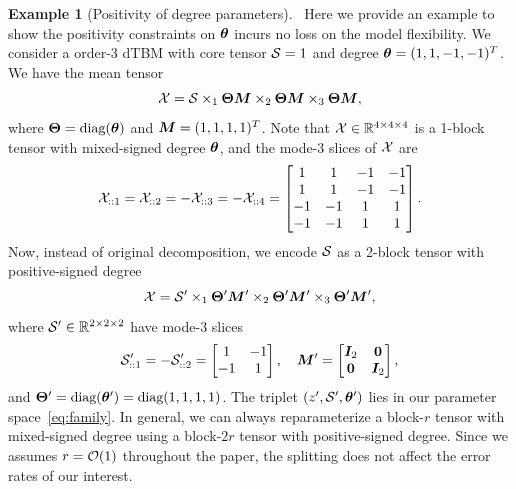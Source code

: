\documentclass[lettersize,onecolumn,journal]{IEEEtran}
\theoremstyle{definition}
\theoremstyle{definition}
\newtheorem{example}{Example}
\begin{document}
\begin{example}[Positivity of degree parameters]~\label{ex:positive}
Here we provide an example to show the positivity constraints on $\boldsymbol{\theta}$ incurs no loss on the model flexibility. 
{\color{blue}
We consider a order-3 dTBM with core tensor $\mathcal{S} = 1$ and degree $\boldsymbol{\theta} = (1,1,-1, -1)^T$. We have the mean tensor 
\begin{equation}
    \mathcal{X} = \mathcal{S} \times_1 \boldsymbol{\Theta} \bm M \times_2 \boldsymbol{\Theta} \bm M \times_3 \boldsymbol{\Theta} \bm M,
\end{equation}
where $\boldsymbol{\Theta} = \text{diag}(\boldsymbol{\theta})$ and $\bm M = (1,1,1,1)^T$. Note that $\mathcal{X} \in \mathbb{R}^{4 \times 4 \times 4}$ is a 1-block tensor with mixed-signed degree $\boldsymbol{\theta}$, and the mode-3 slices of $\mathcal{X}$ are
\begin{equation}
    \mathcal{X}_{::1} = \mathcal{X}_{::2} = - \mathcal{X}_{::3} = -\mathcal{X}_{::4}  = \begin{bmatrix}
    1 & 1& -1& -1 \\
    1 & 1& -1& -1 \\
    -1& -1&1 & 1\\
     -1& -1&1 & 1
    \end{bmatrix}.
\end{equation}
Now, instead of original decomposition, we encode $\mathcal{S}$ as a 2-block tensor with positive-signed degree
\begin{equation}
     \mathcal{X} = \mathcal{S}' \times_1 \boldsymbol{\Theta}' \bm M' \times_2 \boldsymbol{\Theta}' \bm M'  \times_3 \boldsymbol{\Theta}' \bm M' , 
\end{equation}
where $\mathcal{S}' \in \mathbb{R}^{2 \times 2 \times 2}$ have mode-3 slices 
\begin{equation}
    \mathcal{S}'_{::1} = -\mathcal{S}'_{::2} = \begin{bmatrix}
    1 & -1 \\
    -1 & 1
    \end{bmatrix}, \quad \bm M' = \begin{bmatrix}
    \bm I_2 & {\bf 0}\\
    {\bf 0} &  \bm I_2
    \end{bmatrix},
\end{equation}
and $\boldsymbol{\Theta}' = \text{diag}(\boldsymbol{\theta}') = \text{diag}(1,1, 1, 1)$. The triplet $(z',\mathcal{S}', \boldsymbol{\theta}')$ lies in our parameter space~\eqref{eq:family}. In general, we can always reparameterize a block-$r$ tensor with mixed-signed degree using a block-$2r$ tensor with positive-signed degree. Since we assumes $r=\mathcal{O}(1)$ throughout the paper, the splitting does not affect the error rates of our interest.
}




\end{example}
\end{document}
